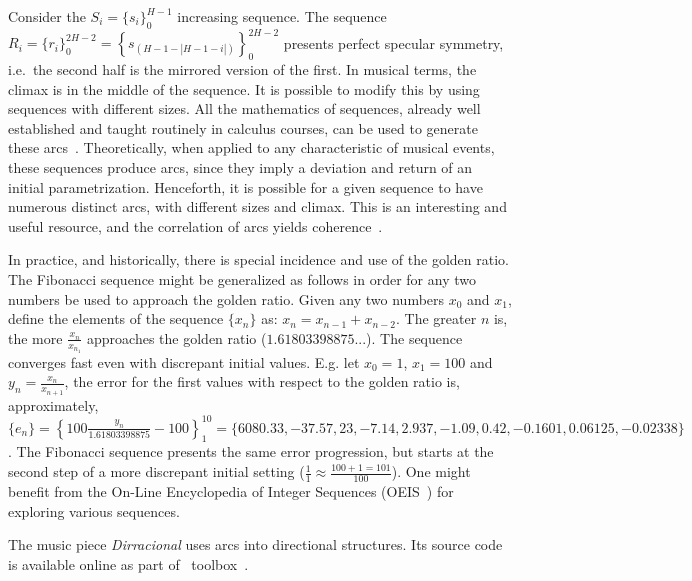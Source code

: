 Consider the $S_i=\{s_i\}_0^{H-1}$ increasing sequence. The sequence
$R_i=\{r_i\}_0^{2H -2}=\left\{s_{(H-1-|H-1-i|)}\right\}_0^{2H-2}$
presents perfect specular symmetry, i.e.\ the second half is the
mirrored version of the first. In musical terms, the climax is
in the middle of the sequence. It is possible to modify this
by using sequences with different sizes. All the mathematics of
sequences, already well established and taught routinely in calculus courses, can be used to generate these arcs~\cite{Guidorizzo,Schoenberg}.
Theoretically, when applied to any characteristic of musical events,
these sequences produce arcs, since they imply a deviation and return of an initial parametrization.
Henceforth, it is possible for a given sequence to have
numerous distinct arcs, with different sizes and climax. 
This is an interesting and useful resource, and the correlation of arcs yields coherence~\cite{Salzer}.

In practice, and historically, there is special incidence and use of the golden ratio.
The Fibonacci sequence might be generalized as follows in order for any two numbers be used
to approach the golden ratio.
Given any two numbers $x_0$
and $x_1$, define the elements of the sequence $\{x_n\}$ as: $x_n=x_{n-1}+x_{n-2}$.
The greater $n$ is, the more $\frac{x_{n}}{x_{n_1}}$ approaches the golden ratio
($1.61803398875...$). The sequence converges fast even with discrepant
initial values.
E.g. let $x_0=1$, $x_1=100$ and $y_n=\frac{x_n}{x_{n+1}}$, the error for the first values with
respect to the golden ratio is, approximately, $\{ e_n \}
=\left\{100\frac{y_n}{1.61803398875}-100 \right\}_1^{10}=\{6080.33, -37.57, 23,
-7.14, 2.937, -1.09, 0.42, -0.1601, 0.06125, -0.02338\}$. The Fibonacci sequence
presents the same error progression, but starts at the second step of a more discrepant initial setting
($\frac{1}{1}\approx\frac{100+1 = 101}{100}$).
One might benefit from the On-Line Encyclopedia of Integer Sequences (OEIS~\cite{oeis})
for exploring various sequences.

The music piece \emph{Dirracional} uses arcs into directional structures. Its source code is available online as part
of \massa\ toolbox~\cite{MASSA}.

